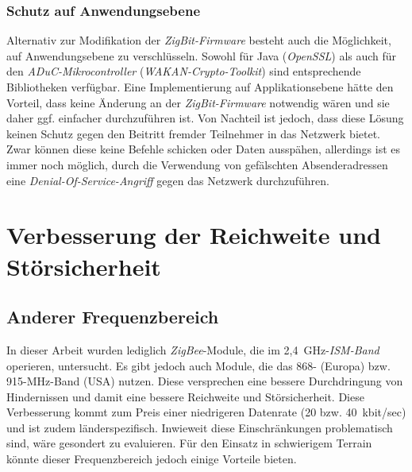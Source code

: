 \subsubsection{Schutz auf Anwendungsebene}
Alternativ zur Modifikation der \emph{ZigBit-Firmware} besteht auch die Möglichkeit, auf Anwendungsebene zu verschlüsseln.
Sowohl für Java (\emph{OpenSSL}) als auch für den \emph{ADuC-Mikrocontroller} (\emph{WAKAN-Crypto-Toolkit}) sind 
entsprechende Bibliotheken
verfügbar. Eine Implementierung auf Applikationsebene hätte den Vorteil, dass keine Änderung an der \emph{ZigBit-Firmware}
notwendig wären und sie daher ggf. einfacher durchzuführen ist. Von Nachteil ist jedoch, dass diese Lösung keinen Schutz
gegen den Beitritt fremder Teilnehmer in das Netzwerk bietet. Zwar können diese keine Befehle schicken oder Daten ausspähen,
allerdings ist es immer noch möglich, durch die Verwendung von gefälschten Absenderadressen eine 
\emph{Denial-Of-Service-Angriff} gegen das Netzwerk durchzuführen. 

\section{Verbesserung der Reichweite und Störsicherheit}
\subsection{Anderer Frequenzbereich}
In dieser Arbeit wurden lediglich \emph{ZigBee}-Module, die im 2,4~GHz-\emph{ISM-Band} operieren, untersucht. Es gibt
jedoch auch Module, die das 868- (Europa) bzw. 915-MHz-Band (USA) nutzen. Diese versprechen eine bessere Durchdringung
von Hindernissen und damit eine bessere Reichweite und Störsicherheit. Diese Verbesserung kommt zum Preis einer
niedrigeren Datenrate (20 bzw. 40~kbit/sec) und ist zudem länderspezifisch. Inwieweit diese Einschränkungen problematisch
sind, wäre gesondert zu evaluieren. Für den Einsatz in schwierigem Terrain könnte dieser Frequenzbereich jedoch einige
Vorteile bieten.

